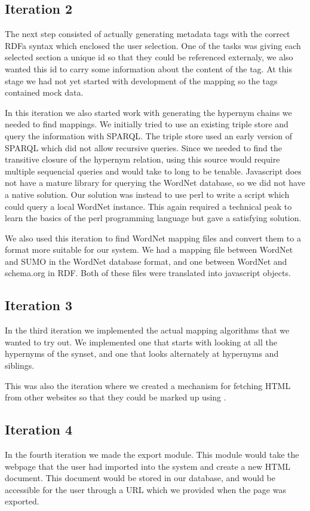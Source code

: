 \subsection{Iteration 2}
The next step consisted of actually generating metadata tags with the correct RDFa syntax which enclosed the user selection.
One of the tasks was giving each selected section a unique id so that they could be referenced externaly,
we also wanted this id to carry some information about the content of the tag.
At this stage we had not yet started with development of the mapping so the tags contained mock data.

In this iteration we also started work with generating the hypernym chains we needed to find mappings.
We initially tried to use an existing triple store and query the information with SPARQL.
The triple store used an early version of SPARQL which did not allow recursive queries.
Since we needed to find the transitive closure of the hypernym relation,
using this source would require multiple sequencial queries and would take to long to be tenable.
Javascript does not have a mature library for querying the WordNet database, so we did not have a native solution.
Our solution was instead to use perl to write a script which could query a local WordNet instance.
This again required a technical peak to learn the basics of the perl programming language but gave a satisfying solution.

We also used this iteration to find WordNet mapping files and convert them to a format more suitable for our system.
We had a mapping file between WordNet and SUMO in the WordNet database format,
and one between WordNet and schema.org in RDF.
Both of these files were translated into javascript objects.

\subsection{Iteration 3}
In the third iteration we implemented the actual mapping algorithms that we wanted to try out.
We implemented one that starts with looking at all the hypernyms of the synset,
and one that looks alternately at hypernyms and siblings.

This was also the iteration where we created a mechanism for fetching HTML from other websites so that they could be
marked up using \theartefact.

\subsection{Iteration 4}
In the fourth iteration we made the export module.
This module would take the webpage that the user had imported into the system and create a new HTML document.
This document would be stored in our database, and would be accessible for the user through a URL which we provided when the page was exported.

